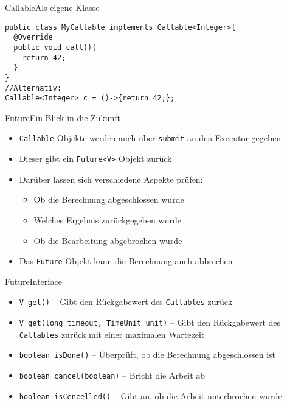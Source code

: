 \begin{frame}[fragile]{Callable}{Als eigene Klasse}
\lstset{style=java}
\begin{lstlisting}
public class MyCallable implements Callable<Integer>{
  @Override
  public void call(){
    return 42;
  }
}
//Alternativ:
Callable<Integer> c = ()->{return 42;};
\end{lstlisting}
\end{frame}

\begin{frame}{Future}{Ein Blick in die Zukunft}
    \begin{itemize}
        \item \texttt{Callable} Objekte werden auch über \texttt{submit} an den Executor gegeben
        \item Dieser gibt ein \texttt{Future<V>} Objekt zurück
        \item Darüber lassen sich verschiedene Aspekte prüfen:
        \begin{itemize}
            \item Ob die Berechnung abgeschlossen wurde
            \item Welches Ergebnis zurückgegeben wurde
            \item Ob die Bearbeitung abgebrochen wurde
        \end{itemize}
        \item Das \texttt{Future} Objekt kann die Berechnung auch abbrechen
    \end{itemize}
\end{frame}

\begin{frame}{Future}{Interface}
    \begin{itemize}
        \item \texttt{V get()} -- Gibt den Rückgabewert des \texttt{Callables} zurück
        \item \texttt{V get(long timeout, TimeUnit unit)} -- Gibt den Rückgabewert des \texttt{Callables} zurück mit einer maximalen Wartezeit
        \item \texttt{boolean isDone()} -- Überprüft, ob die Berechnung abgeschlossen ist
        \item \texttt{boolean cancel(boolean)} -- Bricht die Arbeit ab
        \item \texttt{boolean isCencelled()} -- Gibt an, ob die Arbeit unterbrochen wurde
    \end{itemize}
\end{frame}
